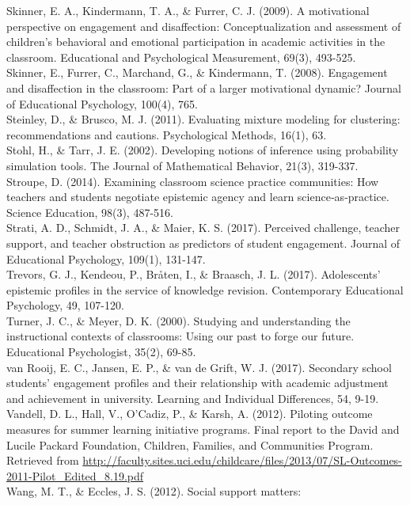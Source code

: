 \documentclass[]{book}
\theoremstyle{definition}
\theoremstyle{definition}
\theoremstyle{definition}
\theoremstyle{remark}
\begin{document}
Skinner, E. A., Kindermann, T. A., \& Furrer, C. J. (2009). A
motivational perspective on engagement and disaffection:
Conceptualization and assessment of children's behavioral and emotional
participation in academic activities in the classroom. Educational and
Psychological Measurement, 69(3), 493-525.\\
Skinner, E., Furrer, C., Marchand, G., \& Kindermann, T. (2008).
Engagement and disaffection in the classroom: Part of a larger
motivational dynamic? Journal of Educational Psychology, 100(4), 765.\\
Steinley, D., \& Brusco, M. J. (2011). Evaluating mixture modeling for
clustering: recommendations and cautions. Psychological Methods, 16(1),
63.\\
Stohl, H., \& Tarr, J. E. (2002). Developing notions of inference using
probability simulation tools. The Journal of Mathematical Behavior,
21(3), 319-337.\\
Stroupe, D. (2014). Examining classroom science practice communities:
How teachers and students negotiate epistemic agency and learn
science‐as‐practice. Science Education, 98(3), 487-516.\\
Strati, A. D., Schmidt, J. A., \& Maier, K. S. (2017). Perceived
challenge, teacher support, and teacher obstruction as predictors of
student engagement. Journal of Educational Psychology, 109(1),
131-147.\\
Trevors, G. J., Kendeou, P., Bråten, I., \& Braasch, J. L. (2017).
Adolescents' epistemic profiles in the service of knowledge revision.
Contemporary Educational Psychology, 49, 107-120.\\
Turner, J. C., \& Meyer, D. K. (2000). Studying and understanding the
instructional contexts of classrooms: Using our past to forge our
future. Educational Psychologist, 35(2), 69-85.\\
van Rooij, E. C., Jansen, E. P., \& van de Grift, W. J. (2017).
Secondary school students' engagement profiles and their relationship
with academic adjustment and achievement in university. Learning and
Individual Differences, 54, 9-19.\\
Vandell, D. L., Hall, V., O'Cadiz, P., \& Karsh, A. (2012). Piloting
outcome measures for summer learning initiative programs. Final report
to the David and Lucile Packard Foundation, Children, Families, and
Communities Program. Retrieved from
\url{http://faculty.sites.uci.edu/childcare/files/2013/07/SL-Outcomes-2011-Pilot_Edited_8.19.pdf}\\
Wang, M. T., \& Eccles, J. S. (2012). Social support matters:
\end{document}
